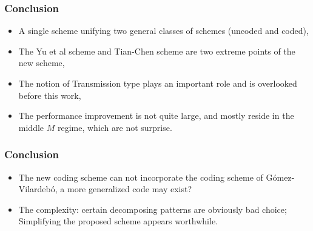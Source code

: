 \documentclass{beamer}
\begin{document}
\begin{frame}
\frametitle{Conclusion}
\begin{itemize}
\item A single scheme unifying two general classes of schemes (uncoded and coded),
\item The Yu et al scheme and Tian-Chen scheme are two extreme points of the new scheme,
\item The notion of Transmission type plays an important role and is overlooked before this work, 
\item The performance improvement is not quite large, and mostly reside in the middle $M$ regime, which are not surprise.
\end{itemize}
\end{frame}

\begin{frame}
\frametitle{Conclusion}
\begin{itemize}
\item The new coding scheme can not incorporate the coding scheme of G{\'o}mez-Vilardeb{\'o}\footnotemark[1], a more generalized code may exist?
\item The complexity: certain decomposing patterns are obviously bad choice; Simplifying the proposed scheme appears worthwhile.
\end{itemize}
\end{frame}
\end{document}
